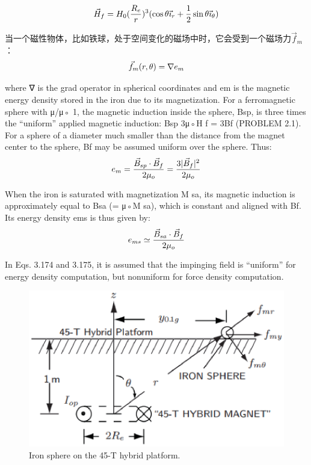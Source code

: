 \begin{equation}
\vec{H}_{f}=H_{0}(\frac{R_{e}}{r})^{3}(\cos\theta\vec{\imath}_{r}+\frac{1}{2}\sin\theta\vec{\imath}_{\theta})\\%
\end{equation}

当一个磁性物体，比如铁球，处于空间变化的磁场中时，它会受到一个磁场力$\vec{f}_m$：
\begin{equation}
\vec{f}_{m}(r,\theta)=\nabla e_{m}\\%
\end{equation}

where ∇ is the grad operator in spherical coordinates and em is the magnetic
energy density stored in the iron due to its magnetization. For a ferromagnetic
sphere with μ/μ◦  1, the magnetic induction inside the sphere, Bsp, is three times
the “uniform” applied magnetic induction: Bsp  3μ◦H f = 3Bf (PROBLEM 2.1).
For a sphere of a diameter much smaller than the distance from the magnet center
to the sphere, Bf may be assumed uniform over the sphere. Thus:
\begin{equation}
e_{m}=\frac{\vec{B}_{sp}\cdot\vec{B}_{f}}{2\mu_{o}}=\frac{3|\vec{B}_{f}|^{2}}{2\mu_{o}}\\%
\end{equation}

When the iron is saturated with magnetization M sa, its magnetic induction is
approximately equal to Bsa (= μ◦M sa), which is constant and aligned with Bf.
Its energy density ems is thus given by:
\begin{equation}
e_{ms}\simeq\frac{\vec{B}_{sa}\cdot\vec{B}_{f}}{2\mu_{o}}\\%
\end{equation}

In Eqs. 3.174 and 3.175, it is assumed that the impinging field is “uniform” for
energy density computation, but nonuniform for force density computation.

\begin{figure}[htbp]
	\centering
	\includegraphics[scale=0.5]{chpt3/figs/fig3.46.eps}
	\caption{Iron sphere on the 45-T hybrid platform.}
\end{figure}

